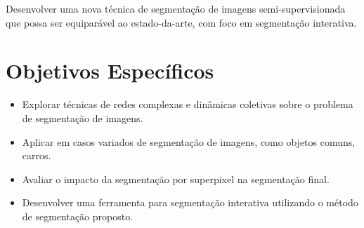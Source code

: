 Desenvolver uma nova técnica de segmentação de imagens
semi-supervisionada que possa ser equiparável ao estado-da-arte, com
foco em segmentação interativa.

\section{Objetivos Específicos}\label{sec:objetivo-geral}

\begin{itemize}
\item Explorar técnicas de redes complexas e dinâmicas coletivas sobre
  o problema de segmentação de imagens.
\item Aplicar em casos variados de segmentação de imagens, como
  objetos comuns, carros.
\item Avaliar o impacto da segmentação por superpixel na segmentação final.
\item Desenvolver uma ferramenta para segmentação interativa
  utilizando o método de segmentação proposto.
\end{itemize}




